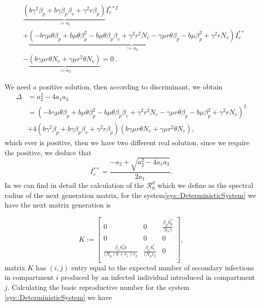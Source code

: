\begin{equation}\label{eqn::QuadraticInfectedFP}
    \begin{aligned}
    	&\underbrace{
    		(
    		b \gamma^2 \beta_p + 
    		b \gamma \beta_p \beta_v + 
    		\gamma^2 r \beta_p
    		)
    	    }_{:=a_1} I_v^{**2}\\
    	&+ 
    	\underbrace{
    	(-b \gamma \mu \theta \beta_p + 
    		b \mu \theta \beta_p ^ 2 - 
    		b \mu \theta \beta_p \beta_v + 
    		\gamma^2 r^2 N_v - 
    		\gamma \mu r 
    		\theta \beta_p - 
    		b \mu \beta_p^ 2 + 
    		\gamma ^ 2 r N_v
    		)
    		}_{:=a_2} I^{**}_v \\
    		&- 
    	\underbrace{
    	(b\gamma\mu r\theta N_v+\gamma\mu r^2\theta N_v
    	)}_{:=a_3}=0 \ .
\end{aligned}
\end{equation}

We need a positive solution, then according to discriminant, we obtain
\begin{equation*}
	\begin{aligned}
		\Delta &= 
		a_2  ^ 2 -  4a_1 a_3
		\\
		&=
			(
				- b \gamma \mu \theta \beta_p +
				b \mu \theta \beta_p^2 -
				b \mu \theta \beta_p \beta_v + 
				\gamma ^ 2 r ^ 2 N_v - 
				\gamma \mu r \theta \beta_p - 
				b \mu \beta_p ^ 2 + 
				\gamma ^ 2 r N_v 
			) ^ 2
		\\
		& +  
		4( 
			b \gamma ^ 2 \beta_p + 
			b \gamma \beta_p
			\beta_v + 
			\gamma^2 r \beta_p
		)
		(
			b \gamma \mu r 
			\theta N_v + 
			\gamma \mu r ^ 2 \theta N_v
		),			
	\end{aligned}	
\end{equation*}
which ever is positive, then we have two different real solution, 
since we require the positive, we deduce that
\begin{equation*}
	I^{**}_{v} = 
		\frac{
			-a_2 + 
			\sqrt{a_2^2 - 4a_1 a_3}}%
		{2a_1}.
\end{equation*}
In \cite{VandenDriessche2017} we can find in detail the calculation of the $ \mathcal{R}^d_0$
which we define as the spectral radius of the next generation matrix, for the
system\autoref{sys::DeterministicSystem} we have the next matrix generation is

\begin{equation}\label{Mtx::NextGenerationMatrix}
    K:=
        \begin{bmatrix}
        0 & 0 &\frac{\beta_p S^*_p}{N_v \gamma} \\
        0 & 0 & 0 \\
        \frac{\beta_v S^*_v b}{(N_p (b+r_1) r_2} & \frac{\beta_v S^*_v}{(N_p r_2} & 0\\
        \end{bmatrix},
\end{equation}
%
matrix $K$  has $(i, j)$ entry equal to the expected number of secondary infections in compartment $i$
produced by an infected individual introduced in compartment $j$. Calculating the basic reproductive
number for the system \autoref{sys::DeterministicSystem} we have

